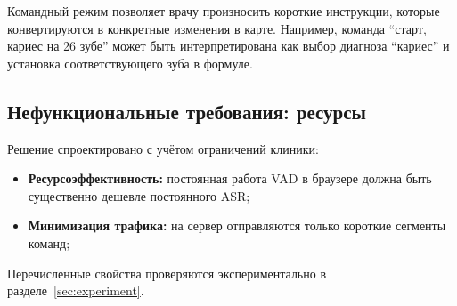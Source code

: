 Командный режим позволяет врачу произносить короткие инструкции, которые конвертируются в конкретные изменения в карте.
Например, команда \enquote{старт, кариес на 26 зубе} может быть интерпретирована как выбор диагноза \enquote{кариес} и установка соответствующего зуба в формуле.

\subsection{Нефункциональные требования: ресурсы}
\label{subsec:nfr}

Решение спроектировано с учётом ограничений клиники:
\begin{itemize}
    \item \textbf{Ресурсоэффективность:} постоянная работа VAD в браузере должна быть существенно дешевле постоянного ASR;
    \item \textbf{Минимизация трафика:} на сервер отправляются только короткие сегменты команд;
\end{itemize}

Перечисленные свойства проверяются экспериментально в разделе~\ref{sec:experiment}.
